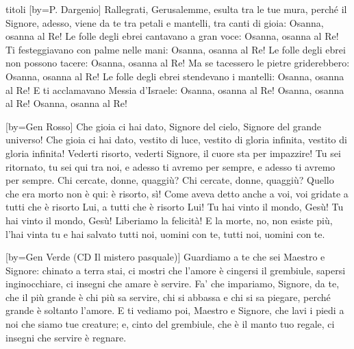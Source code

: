 \begin{songs}{titoli}
[by={P. Dargenio}]
\beginchorus
Rallegrati, Gerusalemme,
esulta tra le tue mura,
perché il Signore, adesso, viene da te
tra petali e mantelli, tra canti di gioia:
Osanna, osanna al Re!
\endchorus
\beginverse
Le folle degli ebrei cantavano a gran voce:
Osanna, osanna al Re!
Ti festeggiavano con palme nelle mani:
Osanna, osanna al Re!
\endverse
\beginverse
Le folle degli ebrei non possono tacere:
Osanna, osanna al Re!
Ma se tacessero le pietre griderebbero:
Osanna, osanna al Re!
\endverse
\beginverse
Le folle degli ebrei stendevano i mantelli:
Osanna, osanna al Re!
E ti acclamavano Messia d'Israele:
Osanna, osanna al Re!
\endverse
\beginverse*
Osanna, osanna al Re!
Osanna, osanna al Re!
\endverse
\endsong

[by={Gen Rosso}]
\beginverse
Che gioia ci hai dato, Signore del cielo, Signore del grande universo!
Che gioia ci hai dato, vestito di luce, vestito di gloria infinita,
vestito di gloria infinita!
\endverse
\beginverse
Vederti risorto, vederti Signore, il cuore sta per impazzire!
Tu sei ritornato, tu sei qui tra noi, e adesso ti avremo per sempre,
e adesso ti avremo per sempre.
\endverse
\beginverse
Chi cercate, donne, quaggiù? Chi cercate, donne, quaggiù?
Quello che era morto non è qui:
è risorto, sì! Come aveva detto anche a voi, voi gridate a tutti che
è risorto Lui, a tutti che è risorto Lui!
\endverse
\beginverse
Tu hai vinto il mondo, Gesù! Tu hai vinto il mondo, Gesù!
Liberiamo la felicità!
E la morte, no, non esiste più, l'hai vinta tu e hai salvato tutti noi,
uomini con te, tutti noi, uomini con te.
\endverse
\endsong

[by={Gen Verde (CD Il mistero pasquale)}]
\beginverse
Guardiamo a te che sei Maestro e Signore:
chinato a terra stai, ci mostri che l'amore
è cingersi il grembiule, sapersi inginocchiare,
ci insegni che amare
è servire.
\endverse
\beginchorus
Fa' che impariamo, Signore, da te,
che il più grande è chi più sa servire,
chi si abbassa e chi si sa piegare,
perché grande è soltanto l'amore.
\endchorus
\beginverse
E ti vediamo poi, Maestro e Signore,
che lavi i piedi a noi che siamo tue creature;
e, cinto del grembiule, che è il manto tuo regale,
ci insegni che servire
è regnare.
\endverse
\endsong


\end{songs}
